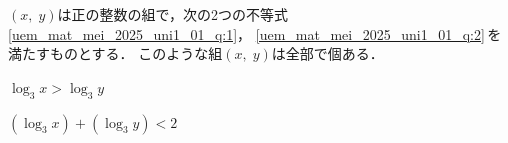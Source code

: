\documentclass[../../../../uem_mat_mei_q.tex]{subfiles}
\begin{document}
    $(x,\;y)$は正の整数の組で，次の2つの不等式\,\ref{uem_mat_mei_2025_uni1_01_q:1}，%
    \ref{uem_mat_mei_2025_uni1_01_q:2}\,を満たすものとする．%
    このような組$(x,\;y)$は全部で\:\:個ある．
    
    \begin{myenua}
        \item $\log_3 x>\log_3 y$ \label{uem_mat_mei_2025_uni1_01_q:1}
        \item $(\log_3 x)+(\log_3 y)<2$ \label{uem_mat_mei_2025_uni1_01_q:2}
    \end{myenua}
\end{document}

